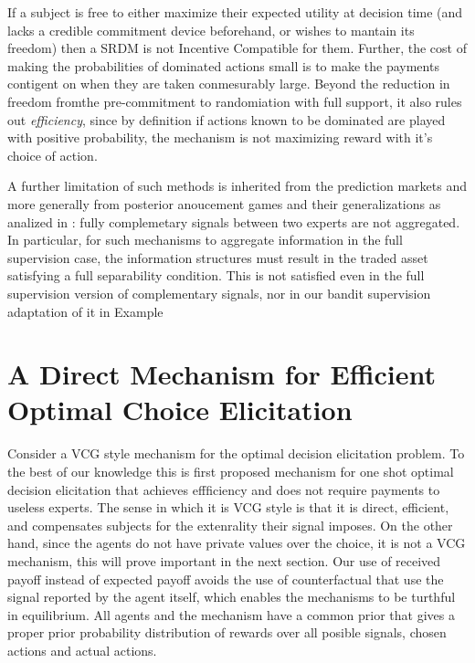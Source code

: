 If a subject is free to either maximize their expected utility at decision time (and lacks a credible commitment device beforehand, or wishes to mantain its freedom) then a SRDM is not Incentive Compatible for them. Further, the cost of making the probabilities of dominated actions small is to make the payments contigent on when they are taken conmesurably large.
Beyond the reduction in freedom fromthe pre-commitment to randomiation with full support, it also rules out \emph{efficiency}, since by definition if actions known to be dominated are played with positive probability, the mechanism is not maximizing reward with it's choice of action. 


A further limitation of such methods is inherited from the prediction markets and more generally from posterior anoucement games and their generalizations as analized in \cite{ostrovsky2012information}: fully complemetary signals between two experts are not aggregated. In particular, for such mechanisms to aggregate information in the full supervision case, the information structures must result in the traded asset satisfying a full separability condition. This is not satisfied even in the full supervision version of complementary signals, nor in our bandit supervision adaptation of it in Example~



\section{A Direct Mechanism for Efficient Optimal Choice Elicitation}

Consider a VCG style mechanism for the optimal decision elicitation problem. To the best of our knowledge this is first proposed  mechanism for one shot optimal decision elicitation that achieves effficiency and does not require payments to useless experts.
The sense in which it is VCG style is that it is direct, efficient, and compensates subjects for the extenrality their signal imposes. On the other hand, since the agents do not have private values over the choice, it is not a VCG mechanism, this will prove important in the next section.
Our use of received payoff instead of expected payoff avoids the use of counterfactual that use the signal reported by the agent itself, which enables the mechanisms to be turthful in equilibrium.
All agents and the mechanism have a common prior that gives a proper prior probability distribution of rewards over all posible signals, chosen actions and actual actions.

